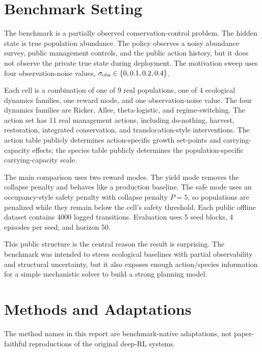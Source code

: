 \documentclass[11pt]{article}
\begin{document}
\section{Benchmark Setting}

The benchmark is a partially observed conservation-control problem. The hidden
state is true population abundance. The policy observes a noisy abundance
survey, public management controls, and the public action history, but it does
not observe the private true state during deployment. The motivation sweep uses
four observation-noise values, $\sigma_{\mathrm{obs}} \in \{0,0.1,0.2,0.4\}$.

Each cell is a combination of one of 9 real populations, one of 4 ecological
dynamics families, one reward mode, and one observation-noise value. The four
dynamics families are Ricker, Allee, theta-logistic, and regime-switching. The
action set has 11 real management actions, including do-nothing, harvest,
restoration, integrated conservation, and translocation-style interventions.
The action table publicly determines action-specific growth set-points and
carrying-capacity effects; the species table publicly determines the
population-specific carrying-capacity scale.

The main comparison uses two reward modes. The yield mode removes the collapse
penalty and behaves like a production baseline. The safe mode uses an
occupancy-style safety penalty with collapse penalty $P=5$, so populations are
penalized while they remain below the cell's safety threshold. Each public
offline dataset contains 4000 logged transitions. Evaluation uses 5 seed blocks,
4 episodes per seed, and horizon 50.

This public structure is the central reason the result is surprising. The
benchmark was intended to stress ecological baselines with partial observability
and structural uncertainty, but it also exposes enough action/species
information for a simple mechanistic solver to build a strong planning model.

\section{Methods and Adaptations}

The method names in this report are benchmark-native adaptations, not
paper-faithful reproductions of the original deep-RL systems.
\end{document}
